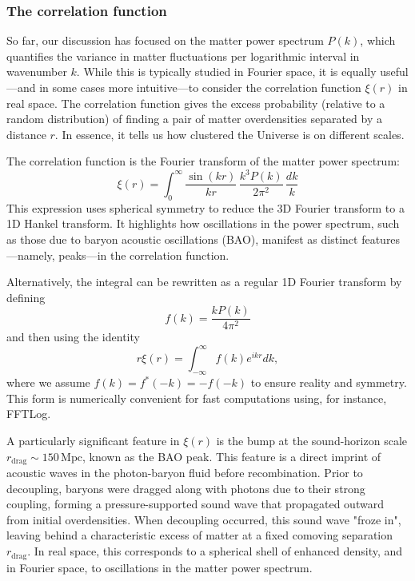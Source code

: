 \documentclass{aa}
\numberwithin{equation}{section}
\numberwithin{table}{section}
\numberwithin{figure}{section}
\begin{document}





\subsubsection{The correlation function}
\color{Plum}
So far, our discussion has focused on the matter power spectrum $P(k)$, which quantifies the variance in matter fluctuations per logarithmic interval in wavenumber $k$. While this is typically studied in Fourier space, it is equally useful—and in some cases more intuitive—to consider the correlation function $\xi(r)$ in real space. The correlation function gives the excess probability (relative to a random distribution) of finding a pair of matter overdensities separated by a distance $r$. In essence, it tells us how clustered the Universe is on different scales.

The correlation function is the Fourier transform of the matter power spectrum:
\begin{equation}
\xi(r) = \int_0^\infty \frac{\sin(kr)}{kr} \, \frac{k^3 P(k)}{2\pi^2} \, \frac{dk}{k}
\end{equation}
This expression uses spherical symmetry to reduce the 3D Fourier transform to a 1D Hankel transform. It highlights how oscillations in the power spectrum, such as those due to baryon acoustic oscillations (BAO), manifest as distinct features—namely, peaks—in the correlation function.

Alternatively, the integral can be rewritten as a regular 1D Fourier transform by defining
\begin{equation}
f(k) = \frac{kP(k)}{4\pi^2}
\end{equation}
and then using the identity
\begin{equation}
r\xi(r) = \int_{-\infty}^{\infty} f(k) e^{ikr} dk,
\end{equation}
where we assume $f(k) = f^*(-k) = -f(-k)$ to ensure reality and symmetry. This form is numerically convenient for fast computations using, for instance, FFTLog.

A particularly significant feature in $\xi(r)$ is the bump at the sound-horizon scale $r_\text{drag} \sim 150 \, \text{Mpc}$, known as the BAO peak. This feature is a direct imprint of acoustic waves in the photon-baryon fluid before recombination. Prior to decoupling, baryons were dragged along with photons due to their strong coupling, forming a pressure-supported sound wave that propagated outward from initial overdensities. When decoupling occurred, this sound wave "froze in", leaving behind a characteristic excess of matter at a fixed comoving separation $r_\text{drag}$. In real space, this corresponds to a spherical shell of enhanced density, and in Fourier space, to oscillations in the matter power spectrum.
\end{document}
